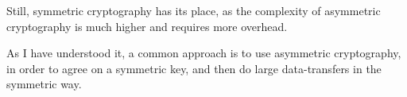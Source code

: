 \documentclass{article}
\begin{document}
Still, symmetric cryptography has its place, as the complexity of asymmetric cryptography is much higher and requires more overhead. 

As I have understood it, a common approach is to use asymmetric cryptography, in order to agree on a symmetric key, and then do large data-transfers in the symmetric way. 




\newpage

\nocite{*}



\end{document}
